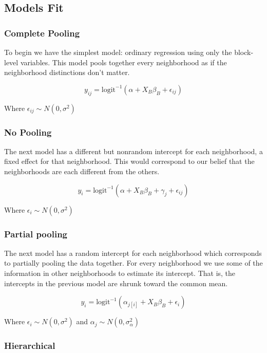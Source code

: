 \documentclass{report}
\begin{document}
\subsection*{Models Fit}

\subsubsection*{Complete Pooling}

To begin we have the simplest model: ordinary regression using only the block-level variables. This model pools together every neighborhood as if the neighborhood distinctions don't matter. 

$$ y_{ij} = \text{logit}^{-1}\left( \alpha + X_{B}\beta_{B} + \epsilon_{ij} \right) $$

Where $\epsilon_{ij} \sim N(0, \sigma^2)$

\subsubsection*{No Pooling}

The next model has a different but nonrandom intercept for each neighborhood, a fixed effect for that neighborhood. This would correspond to our belief that the neighborhoods are each different from the others. 

$$ y_{i} = \text{logit}^{-1}\left( \alpha + X_{B}\beta_{B} +  \gamma_j + \epsilon_{ij} \right) $$

Where $\epsilon_i \sim N(0, \sigma^2)$ 

\subsubsection*{Partial pooling}

The next model has a random intercept for each neighborhood which corresponds to partially pooling the data together. For every neighborhood we use some of the information in other neighborhoods to estimate its intercept. That is, the intercepts in the previous model are shrunk toward the common mean. 

$$ y_{i} = \text{logit}^{-1}\left( \alpha_{j[i]} + X_{B}\beta_{B} +  \epsilon_i \right) $$

Where $\epsilon_i \sim N(0, \sigma^2)$ and $\alpha_j \sim N(0, \sigma^2_\alpha)$

\subsubsection*{Hierarchical}
\end{document}

